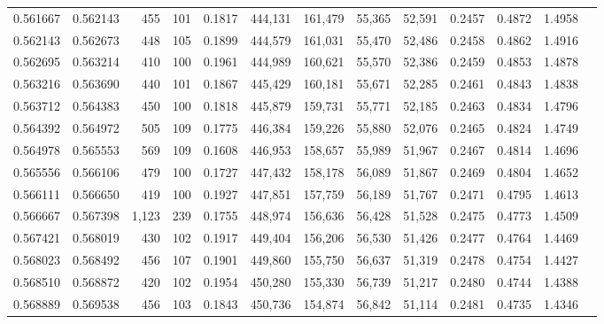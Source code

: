 \begin{tabular}{rrrrrrrrrrrrr}
0.561667 & 0.562143 &    455 &   101 &                                     0.1817 & 444,131 & 161,479 &  55,365 &  52,591 & 0.2457 & 0.4872 & 1.4958 \\
0.562143 & 0.562673 &    448 &   105 &                                     0.1899 & 444,579 & 161,031 &  55,470 &  52,486 & 0.2458 & 0.4862 & 1.4916 \\
0.562695 & 0.563214 &    410 &   100 &                                     0.1961 & 444,989 & 160,621 &  55,570 &  52,386 & 0.2459 & 0.4853 & 1.4878 \\
0.563216 & 0.563690 &    440 &   101 &                                     0.1867 & 445,429 & 160,181 &  55,671 &  52,285 & 0.2461 & 0.4843 & 1.4838 \\
0.563712 & 0.564383 &    450 &   100 &                                     0.1818 & 445,879 & 159,731 &  55,771 &  52,185 & 0.2463 & 0.4834 & 1.4796 \\
0.564392 & 0.564972 &    505 &   109 &                                     0.1775 & 446,384 & 159,226 &  55,880 &  52,076 & 0.2465 & 0.4824 & 1.4749 \\
0.564978 & 0.565553 &    569 &   109 &                                     0.1608 & 446,953 & 158,657 &  55,989 &  51,967 & 0.2467 & 0.4814 & 1.4696 \\
0.565556 & 0.566106 &    479 &   100 &                                     0.1727 & 447,432 & 158,178 &  56,089 &  51,867 & 0.2469 & 0.4804 & 1.4652 \\
0.566111 & 0.566650 &    419 &   100 &                                     0.1927 & 447,851 & 157,759 &  56,189 &  51,767 & 0.2471 & 0.4795 & 1.4613 \\
0.566667 & 0.567398 &  1,123 &   239 &                                     0.1755 & 448,974 & 156,636 &  56,428 &  51,528 & 0.2475 & 0.4773 & 1.4509 \\
0.567421 & 0.568019 &    430 &   102 &                                     0.1917 & 449,404 & 156,206 &  56,530 &  51,426 & 0.2477 & 0.4764 & 1.4469 \\
0.568023 & 0.568492 &    456 &   107 &                                     0.1901 & 449,860 & 155,750 &  56,637 &  51,319 & 0.2478 & 0.4754 & 1.4427 \\
0.568510 & 0.568872 &    420 &   102 &                                     0.1954 & 450,280 & 155,330 &  56,739 &  51,217 & 0.2480 & 0.4744 & 1.4388 \\
0.568889 & 0.569538 &    456 &   103 &                                     0.1843 & 450,736 & 154,874 &  56,842 &  51,114 & 0.2481 & 0.4735 & 1.4346 \\

\end{tabular}
